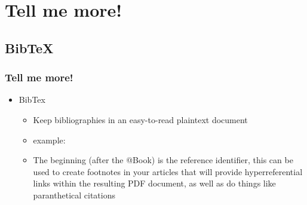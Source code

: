 \documentclass{beamer}
\begin{document}
\section{Tell me more!}
\subsection{BibTeX}
\begin{frame}
  \frametitle{Tell me more!}
  \begin{itemize}
    \item BibTex
      \begin{itemize}
        \item Keep bibliographies in an easy-to-read plaintext document
        \item example:
          
        \item The beginning (after the @Book) is the reference
          identifier, this can be used to create footnotes in your
          articles that will provide hyperreferential links within the
          resulting PDF document, as well as do things like paranthetical citations
      \end{itemize}
  \end{itemize}
\end{frame}
\end{document}
